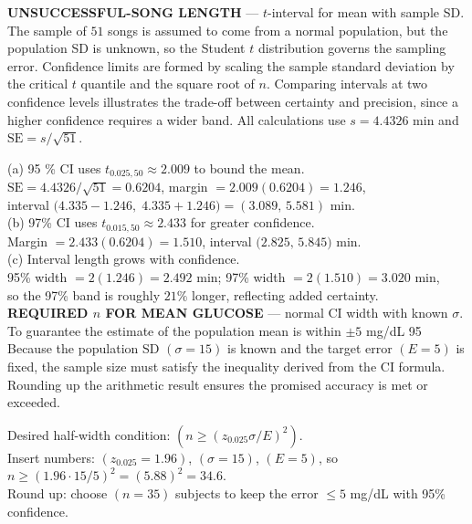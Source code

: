\documentclass[landscape,0.4pt]{article}
\begin{document}
\begin{multicols*}{6}

\textbf{\tiny{UNSUCCESSFUL-SONG LENGTH}} — $t$-interval for mean with sample SD.  
The sample of $51$ songs is assumed to come from a normal population, but the population SD is unknown, so the Student $t$ distribution governs the sampling error.  
Confidence limits are formed by scaling the sample standard deviation by the critical $t$ quantile and the square root of $n$.  
Comparing intervals at two confidence levels illustrates the trade-off between certainty and precision, since a higher confidence requires a wider band.  
All calculations use $s=4.4326$ min and $\text{SE}=s/\sqrt{51}$.

(a) 95 \% CI uses $t_{0.025,50}\approx2.009$ to bound the mean.\\
$\text{SE}=4.4326/\sqrt{51}=0.6204$, margin $=2.009(0.6204)=1.246$,\\
interval $\bigl(4.335-1.246,\;4.335+1.246\bigr)=(3.089,\,5.581)\text{ min}$.\\

(b) 97\% CI uses $t_{0.015,50}\approx2.433$ for greater confidence.\\
Margin $=2.433(0.6204)=1.510$, interval $\bigl(2.825,\,5.845\bigr)\text{ min}$.\\

(c) Interval length grows with confidence.\\
95\% width $=2(1.246)=2.492$ min; 97\% width $=2(1.510)=3.020$ min,\\
so the 97\% band is roughly $21\%$ longer, reflecting added certainty.\\[-2pt]


\textbf{\tiny{REQUIRED $n$ FOR MEAN GLUCOSE}} — normal CI width with known $\sigma$.  
To guarantee the estimate of the population mean is within $\pm5$ mg/dL 95 %
Because the population SD $(\sigma=15)$ is known and the target error $(E=5)$ is fixed, the sample size must satisfy the inequality derived from the CI formula.  
Rounding up the arithmetic result ensures the promised accuracy is met or exceeded.

Desired half-width condition: $(n\ge(z_{0.025}\sigma/E)^{2})$.\\
Insert numbers: $(z_{0.025}=1.96)$, $(\sigma=15)$, $(E=5)$, so\\
$n\ge(1.96\cdot15/5)^{2}=(5.88)^{2}=34.6$.\\
Round up: choose $(n=35)$ subjects to keep the error $\le5$ mg/dL with 95\% confidence.\\[-2pt]


\end{multicols*}
\end{document}

